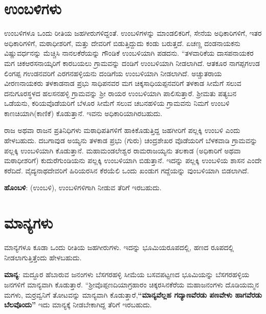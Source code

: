 \section{ಉಂಬಳಿಗಳು}

ಉಂಬಳಿಗಳೂ ಒಂದು ರೀತಿಯ ಜಹಗೀರುಗಳಿದ್ದಂತೆ. ಉಂಬಳಿಗಳನ್ನು ಮಾಂಡಲಿಕರಿಗೆ, ಸೇನೆಯ ಅಧಿಕಾರಿಗಳಿಗೆ, ಇತರ ಅಧಿಕಾರಿಗಳಿಗೆ, ಮಠಾಧೀಶರಿಗೆ, ಮತ್ತು ದೇವರಿಗೆ ಬಿಡುತ್ತಿದ್ದುದು ಕಂಡು ಬರುತ್ತದೆ. ಏಚಣ್ಣ ದಂಡನಾಯಕನು ವಿಷ್ಣುವರ್ಧನನ್ನು ಮೆಚ್ಚಿಸಿ ನಾನಲಕೆರೆಯನ್ನು ಗೌಂಡಿಕೆ ಉಂಬಳಿಯಾಗಿ ಪಡದನು.\textbf{ } “ತಳವಾರಿಕೆಯ ದಾಸಪನಾಯಕರ ಮಗ ಚಿಕಆರಸನಾಯ್ಕರಿಗೆ ಕಾರಬಯಲು ಗ್ರಾಮವನ್ನು ದಂಡಿಗೆ ಉಂಬಳಿಯಾಗಿ ನೀಡಲಾಗಿದೆ. ಆತಕೂರ ನಾಗಪ್ಪಗಉಡ ಲಿಂಗಪ್ಪ ಗಉಡನವರಿಗೆ ಎರಗನಹಳ್ಳಿಯನು ದಂಡಿಗೆಯ ಉಂಬಳಿಯಾಗಿ ನೀಡಲಾಗಿದೆ.  ಅಚ್ಚುತರಾಯ ವೀರಣನಾಯಕರು ತಳಕಾಡನಾಡ ಪ್ರಭು ಸಾಧಿಪನವರ ಮಗ ಚಿಕ್ಕಸಾಧಿಯಪ್ಪನವರಿಗೆ ತಳಕಾಡ ಸೀಮೆಗೆ ಸಲುವ ದನುಗೂರಸ್ಥಳದ ಹಲಸನಹಳ್ಳಿ ಗ್ರಾಮವನ್ನು ಶ‍್ರೀ ರಾಯರ ಉಂಬಳಿಯಾಗಿ ಪಾಲಿಸುತ್ತಾರೆ.\textbf{ }ಶ‍್ರೀಮತು ಪತ್ಯಬನ ಒಡೆಯನು, ಕರಿಯವೊಡೆಯರಿಗೆ ಬೆಳೂರ ಸೀಮೆಗೆ ಸಲುವ ಚಬನಹಳಿಯ ಗ್ರಾಮವನು ನಿಮಗೆ ಉಂಬಳಿ ಕಾಣಚಿಯಾಗಿ(ಕಾಣಿಕೆ) ಕೊಡುತ್ತಾನೆ. ಇವನು ಅಧಿಕಾರಿಯಾಗಿರಬಹುದು.

ರಾಜ ಅಥವಾ ರಾಜನ ಪ್ರತಿನಿಧಿಗಳು ಮಠಾಧಿಪತಿಗಳಿಗೆ ಹಾಕಿಕೊಡುತ್ತಿದ್ದ ಜಹಗೀರಿಗೆ ಪಲ್ಲಕ್ಕಿ ಉಂಬಳಿ ಎಂದು ಹೇಳಬಹುದು. ದಬಗಾವುಡ ಅಯ್ಯನು ತಳಕಾಡ ಪ್ರಭು (ಗುರು) ಚಂದ್ರಶೇಖರ ವೊಡೆಯರಿಗೆ ಬೆಳಕವಾಡಿ ಗ್ರಾಮವನ್ನು ಪಲ್ಲಕ್ಕಿ ಉಂಬಳಿಯಾಗಿ ಕೊಡುತ್ತಾನೆ. ಮಹಾಮಂಡಲೇಶ್ವರ ರಾಮರಾಜಯ್ಯನು ತಲಕಾಡ (ಅಧಿಕಾರಿಗೆ ಅಥವಾ ಮಠಾಧೀಶರಿಗೆ) ಕುದುರೆಗುಂಡಿಯನು ಪಲ್ಲಕ್ಕಿ ಉಂಬಳಿಯಾಗಿ ಬಿಡುತ್ತಾನೆ. ಇದನ್ನು ಪಲ್ಲಕ್ಕಿ ಉಂಬಳಿಯ ಶಾಸನ ಎಂದೇ ಕರೆದಿದೆ. ವೈದ್ಯನಾಥದೇವರಿಗೆ ಹಿರಿಯರಸಿನ ಕೆರಯೆಲಿ ಒಂದು ಖಂಡುಗ ಗದ್ದೆಯನ್ನು ವುಂಬಳಿಯಾಗಿ ಬಿಡಲಾಗಿದೆ.

\textbf{ಹೊಂಬಳಿ}: (ಉಂಬಳಿ), ಉಂಬಳಿಗಳಿಗಾಗಿ ನೀಡುವ ತೆರಿಗೆ ಇರಬಹುದು.


\section{ಮಾನ್ಯಗಳು}

ಮಾನ್ಯಗಳೂ ಕೂಡಾ ಒಂದು ರೀತಿಯ ಜಹಗೀರುಗಳು. ಇದನ್ನು ಭೂಮಿಯರೂಪದಲ್ಲಿ, ಹಣದ ರೂಪದಲ್ಲಿ ನೀಡಲಾಗುತ್ತಿತ್ತೆಂದು ಹೇಳಬಹುದು.

\textbf{ಮಾನ್ಯ}: ಮದ್ದೂರ ಹೆಬಾರುವ ಜನಂಗಳು ಬೆಸಗರಹಳ್ಳಿ ಸೀಮೆಯ ಬಸವಪಟ್ಟಣದ ಭೂಮಿಯನ್ನು ಬೆಸಗರಹಳ್ಳಿಯ ಜನಗಳಿಗೆ ಮಾನ್ಯವಾಗಿ ಕೊಡುತ್ತಾರೆ. “ಶ‍್ರೀವೊಪ್ಪಣದಿಯಾಗ್ರಹಾರಂ ಚಿಕ್ಕರಸಿನಕೆರೆಯ ಮಹಾಜನಂಗಳು ದೊಡಿಯಮ್ಮನ ಮಗಳು, ಮರ್ರವ್ವನಿಗೆ ತೋಟವನ್ನು ಮಾನ್ಯವಾಗಿ ಕೊಡುತ್ತಾರೆ,\textbf{“ಮಾನ್ಯವೆಲ್ಲಹ ಗದ್ಯಾಣವೆರಡು ಪಣವೇಳು ಹಾಗವೆರಡು ಬೆಲವೊಂದು”} ಇದು ಮಾನ್ಯಕ್ಕೆ ನೀಡಬೇಕಾಗಿದ್ದ ತೆರಿಗೆ ಇರಬಹುದು.

